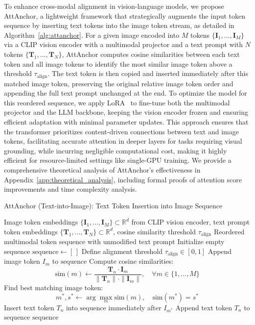 \documentclass[11pt]{article}
\begin{document}
To enhance cross-modal alignment in vision-language models, we propose AttAnchor, a lightweight framework that strategically augments the input token sequence by inserting text tokens into the image token stream, as detailed in Algorithm~\ref{alg:attanchor}. For a given image encoded into $M$ tokens $\{\mathbf{I}_1, \dots, \mathbf{I}_M\}$ via a CLIP vision encoder with a multimodal projector and a text prompt with $N$ tokens $\{\mathbf{T}_1, \dots, \mathbf{T}_N\}$, AttAnchor computes cosine similarities between each text token and all image tokens to identify the most similar image token above a threshold $\tau_{\text{align}}$. The text token is then copied and inserted immediately after this matched image token, preserving the original relative image token order and appending the full text prompt unchanged at the end. To optimize the model for this reordered sequence, we apply LoRA~\citep{hu2022lora} to fine-tune both the multimodal projector and the LLM backbone, keeping the vision encoder frozen and ensuring efficient adaptation with minimal parameter updates. This approach ensures that the transformer prioritizes content-driven connections between text and image tokens, facilitating accurate attention in deeper layers for tasks requiring visual grounding, while incurring negligible computational cost, making it highly efficient for resource-limited settings like single-GPU training. We provide a comprehensive theoretical analysis of AttAnchor's effectiveness in Appendix~\ref{app:theoretical_analysis}, including formal proofs of attention score improvements and time complexity analysis.


\begin{algorithm}[H]
\caption{AttAnchor (Text-into-Image): Text Token Insertion into Image Sequence}
\label{alg:attanchor}
\begin{algorithmic}[1]
\Require Image token embeddings $\{\mathbf{I}_1, \dots, \mathbf{I}_M\} \subset \mathbb{R}^d$ from CLIP vision encoder, text prompt token embeddings $\{\mathbf{T}_1, \dots, \mathbf{T}_N\} \subset \mathbb{R}^d$, cosine similarity threshold $\tau_{\text{align}}$
\Ensure Reordered multimodal token sequence with unmodified text prompt
\State Initialize empty sequence $\text{sequence} \gets [\,]$
\State Define alignment threshold $\tau_{\text{align}} \in [0, 1]$
    \State Append image token $I_m$ to $\text{sequence}$
\EndFor
{}
    \State Compute cosine similarities: 
    \[
        \text{sim}(m) \gets \frac{\mathbf{T}_n \cdot \mathbf{I}_m}{\|\mathbf{T}_n\| \cdot \|\mathbf{I}_m\|}, \quad \forall m \in \{1, \dots, M\}
    \]
    \State Find best matching image token:
    \[
        m^*, s^* \gets \arg\max_{m} \text{sim}(m), \quad \text{sim}(m^*) = s^*
    \]
        \State Insert text token $T_n$ into $\text{sequence}$ immediately after $I_{m^*}$
    \EndIf
\EndFor
{}
    \State Append text token $T_n$ to $\text{sequence}$
\EndFor
\State \Return $\text{sequence}$
\end{algorithmic}
\end{algorithm}
\end{document}
